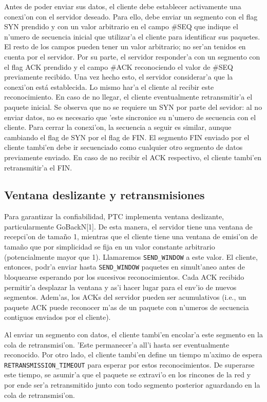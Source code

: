 Antes de poder enviar sus datos, el cliente debe establecer activamente una conexi'on con el servidor deseado. Para ello, debe enviar un segmento con el flag SYN prendido y con un valor arbitrario en el campo \#SEQ que indique el n'umero de secuencia inicial que utilizar'a el cliente para identificar sus paquetes. El resto de los campos pueden tener un valor arbitrario; no ser'an tenidos en cuenta por el servidor. Por su parte, el servidor responder'a con un segmento con el flag ACK prendido y el campo \#ACK reconociendo el valor de \#SEQ previamente recibido. Una vez hecho esto, el servidor considerar'a que la conexi'on está establecida. Lo mismo har'a el cliente al recibir este reconocimiento. En caso de no llegar, el cliente eventualmente retransmitir'a el paquete inicial. Se observa que no se requiere un SYN por parte del sevidor: al no enviar datos, no es necesario que 'este sincronice su n'umero de secuencia con el cliente. Para cerrar la conexi'on, la secuencia a seguir es similar, aunque cambiando el flag de SYN por el flag de FIN. El segmento FIN enviado por el cliente tambi'en debe ir secuenciado como cualquier otro segmento de datos previamente enviado. En caso de no recibir el ACK respectivo, el cliente tambi'en retransmitir'a el FIN.

\subsection{Ventana deslizante y retransmisiones}

Para garantizar la confiabilidad, PTC implementa ventana deslizante, particularmente GoBackN[1]. De esta manera, el servidor tiene una ventana de recepci'on de tamaño 1, mientras que el cliente tiene una ventana de emisi'on de tamaño que por simplicidad se fija en un valor constante arbitrario (potencialmente mayor que
1). Llamaremos \texttt{SEND\_WINDOW} a este valor. El cliente, entonces, podr'a enviar hasta \texttt{SEND\_WINDOW} paquetes en simult'aneo antes de bloquearse esperando por los sucesivos reconocimientos. Cada ACK recibido permitir'a desplazar la ventana y as'i hacer lugar para el env'io de nuevos segmentos. Adem'as, los ACKs del servidor pueden ser acumulativos (i.e., un paquete ACK puede reconocer m'as de un paquete con n'umeros de secuencia contiguos enviados por el cliente).

Al enviar un segmento con datos, el cliente tambi'en encolar'a este segmento en la cola de retransmisi'on. 'Este permanecer'a all'i hasta ser eventualmente reconocido. Por otro lado, el cliente tambi'en define un tiempo m'aximo de espera \texttt{RETRANSMISSION\_TIMEOUT} para esperar por estos reconocimientos. De superarse este tiempo, se asumir'a que el paquete se extravi'o en los rincones de la red y por ende ser'a retransmitido junto con todo segmento posterior aguardando en la cola de retransmisi'on.

